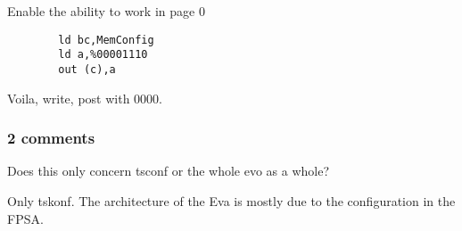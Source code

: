 \documentclass{article}
\begin{document}
Enable the ability to work in page 0

\begin{verbatim}
		ld bc,MemConfig
		ld a,%00001110
		out (c),a
\end{verbatim}

Voila, write, post with 0000.

\subsubsection*{2 comments}

Does this only concern tsconf or the whole evo as a whole?

Only tskonf. The architecture of the Eva is mostly due to the
configuration in the FPSA.
\end{document}
